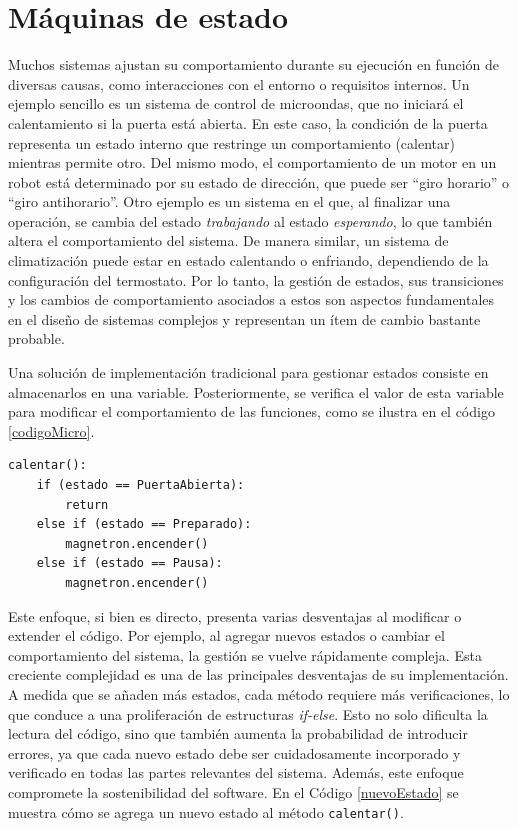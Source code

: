 \section{Máquinas de estado}\label{cap:state}

Muchos sistemas ajustan su comportamiento durante su ejecución en función de diversas causas, como interacciones con el entorno o requisitos internos. Un ejemplo sencillo es un sistema de control de microondas, que no iniciará el calentamiento si la puerta está abierta. En este caso, la condición de la puerta representa un estado interno que restringe un comportamiento (calentar) mientras permite otro. Del mismo modo, el comportamiento de un motor en un robot está determinado por su estado de dirección, que puede ser ``giro horario'' o ``giro antihorario''. Otro ejemplo es un sistema en el que, al finalizar una operación, se cambia del estado \textit{trabajando} al estado \textit{esperando}, lo que también altera el comportamiento del sistema. De manera similar, un sistema de climatización puede estar en estado calentando o enfriando, dependiendo de la configuración del termostato. Por lo tanto, la gestión de estados, sus transiciones y los cambios de comportamiento asociados a estos son aspectos fundamentales en el diseño de sistemas complejos y representan un ítem de cambio bastante probable.

Una solución de implementación tradicional para gestionar estados consiste en almacenarlos en una variable. Posteriormente, se verifica el valor de esta variable para modificar el comportamiento de las funciones, como se ilustra en el código \ref{codigoMicro}.

\begin{lstlisting}[label=codigoMicro,caption={Ejemplo de manejo de estados tradicional, en el caso del microondas.}]
calentar():
    if (estado == PuertaAbierta):
        return
    else if (estado == Preparado):
        magnetron.encender()
    else if (estado == Pausa):
        magnetron.encender()

\end{lstlisting}

Este enfoque, si bien es directo, presenta varias desventajas al modificar o extender el código. Por ejemplo, al agregar nuevos estados o cambiar el comportamiento del sistema, la gestión se vuelve rápidamente compleja. Esta creciente complejidad es una de las principales desventajas de su implementación. A medida que se añaden más estados, cada método requiere más verificaciones, lo que conduce a una proliferación de estructuras \textit{if-else}. Esto no solo dificulta la lectura del código, sino que también aumenta la probabilidad de introducir errores, ya que cada nuevo estado debe ser cuidadosamente incorporado y verificado en todas las partes relevantes del sistema. Además, este enfoque compromete la sostenibilidad del software. En el Código \ref{nuevoEstado} se muestra cómo se agrega un nuevo estado al método \verb|calentar()|.


